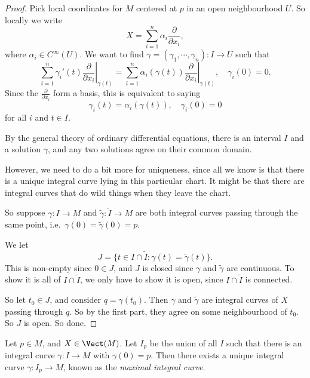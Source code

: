 \documentclass[a4paper]{article}
\begin{document}
\begin{proof}
  Pick local coordinates for $M$ centered at $p$ in an open neighbourhood $U$. So locally we write
  \[
    X = \sum_{i = 1}^n \alpha_i \frac{\partial}{\partial x_i},
  \]
  where $\alpha_i \in C^\infty(U)$. We want to find $\gamma = (\gamma_1, \cdots, \gamma_n): I \to U$ such that
  \[
    \sum_{i = 1}^n \gamma_i'(t) \left.\frac{\partial}{\partial x_i}\right|_{\gamma(t)} = \sum_{i = 1}^n \alpha_i(\gamma(t)) \left.\frac{\partial}{\partial x_i}\right|_{\gamma(t)},\quad \gamma_i(0) = 0.
  \]
  Since the $\frac{\partial}{\partial x_i}$ form a basis, this is equivalent to saying
  \[
    \gamma_i(t) = \alpha_i(\gamma(t)),\quad \gamma_i(0) = 0
  \]
  for all $i$ and $t \in I$.

  By the general theory of ordinary differential equations, there is an interval $I$ and a solution $\gamma$, and any two solutions agree on their common domain.

  However, we need to do a bit more for uniqueness, since all we know is that there is a unique integral curve lying in this particular chart. It might be that there are integral curves that do wild things when they leave the chart.

  So suppose $\gamma: I \to M$ and $\tilde{\gamma}: \tilde{I} \to M$ are both integral curves passing through the same point, i.e.\ $\gamma(0) = \tilde{\gamma}(0) = p$.

  We let
  \[
    J = \{t \in I \cap \tilde{I}: \gamma(t) = \tilde{\gamma}(t)\}.
  \]
  This is non-empty since $0 \in J$, and $J$ is closed since $\gamma$ and $\tilde{\gamma}$ are continuous. To show it is all of $I \cap \tilde{I}$, we only have to show it is open, since $I \cap \tilde{I}$ is connected.

  So let $t_0 \in J$, and consider $q = \gamma(t_0)$. Then $\gamma$ and $\tilde{\gamma}$ are integral curves of $X$ passing through $q$. So by the first part, they agree on some neighbourhood of $t_0$. So $J$ is open. So done.
\end{proof}

\begin{defi}
  Let $p \in M$, and $X \in \Vect(M)$. Let $I_p$ be the union of all $I$ such that there is an integral curve $\gamma: I \to M$ with $\gamma(0) = p$. Then there exists a unique integral curve $\gamma: I_p \to M$, known as the \emph{maximal integral curve}.
\end{defi}
\end{document}
